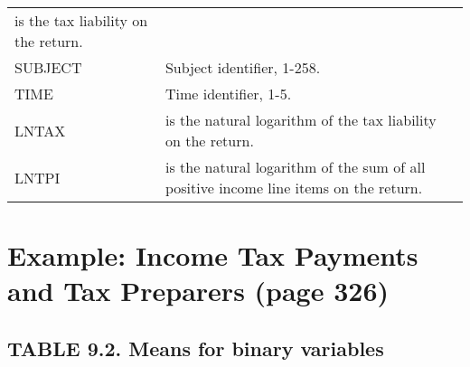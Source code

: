 \documentclass[]{book}
\newenvironment{Shaded}{\begin{snugshade}}{\end{snugshade}}
\newcommand{\KeywordTok}[1]{\textcolor[rgb]{0.13,0.29,0.53}{\textbf{#1}}}
\newcommand{\NormalTok}[1]{#1}
\newcommand{\OperatorTok}[1]{\textcolor[rgb]{0.81,0.36,0.00}{\textbf{#1}}}
\begin{document}
\begin{longtable}[]{@{}ll@{}}
\begin{minipage}[t]{0.86\columnwidth}
is the tax liability on the return.\strut
\end{minipage}\tabularnewline
\begin{minipage}[t]{0.09\columnwidth}\raggedright
SUBJECT\strut
\end{minipage} & \begin{minipage}[t]{0.86\columnwidth}\raggedright
Subject identifier, 1-258.\strut
\end{minipage}\tabularnewline
\begin{minipage}[t]{0.09\columnwidth}\raggedright
TIME\strut
\end{minipage} & \begin{minipage}[t]{0.86\columnwidth}\raggedright
Time identifier, 1-5.\strut
\end{minipage}\tabularnewline
\begin{minipage}[t]{0.09\columnwidth}\raggedright
LNTAX\strut
\end{minipage} & \begin{minipage}[t]{0.86\columnwidth}\raggedright
is the natural logarithm of the tax liability on the return.\strut
\end{minipage}\tabularnewline
\begin{minipage}[t]{0.09\columnwidth}\raggedright
LNTPI\strut
\end{minipage} & \begin{minipage}[t]{0.86\columnwidth}\raggedright
is the natural logarithm of the sum of all positive income line items on the return.\strut
\end{minipage}\tabularnewline
\bottomrule
\end{longtable}

\hypertarget{example-income-tax-payments-and-tax-preparers-page-326}{%
\section{Example: Income Tax Payments and Tax Preparers (page 326)}\label{example-income-tax-payments-and-tax-preparers-page-326}}

\hypertarget{table-9.2.-means-for-binary-variables}{%
\subsection{TABLE 9.2. Means for binary variables}\label{table-9.2.-means-for-binary-variables}}

\begin{Shaded}
\end{Shaded}
\end{document}
